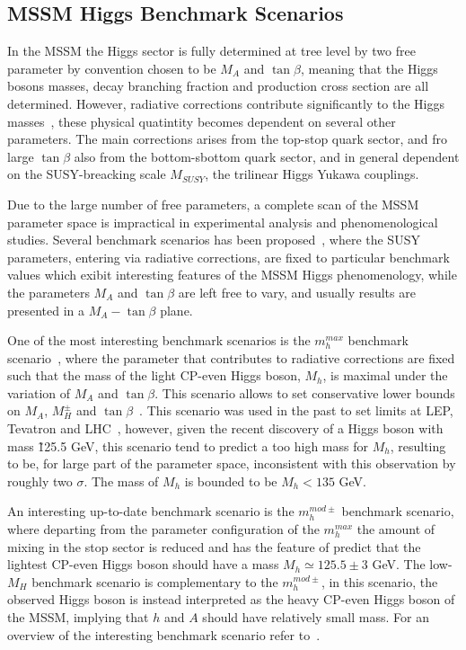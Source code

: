 \subsection{MSSM Higgs Benchmark Scenarios}
In the MSSM  the Higgs sector is fully determined at tree level by two free parameter by convention chosen to be $M_A$ and $\tan\beta$, 
meaning that the Higgs bosons masses, decay branching fraction and production cross section are all determined. However, radiative corrections
contribute significantly to the Higgs masses~\cite{sebThesis26}, these physical quatintity becomes dependent on several other parameters.
The main corrections arises from the top-stop quark sector, and fro large $\tan\beta$ also from the bottom-sbottom quark sector,
and in general dependent on the SUSY-breacking scale $M_{SUSY}$, the trilinear Higgs Yukawa couplings.

Due to the large number of free parameters, a complete scan of the MSSM parameter space is impractical in experimental analysis and phenomenological
studies. Several benchmark scenarios has been proposed~\cite{LHCxsec}, where the SUSY parameters, entering via radiative corrections, 
are fixed to particular benchmark values which exibit interesting features of the MSSM Higgs phenomenology, while the parameters 
$M_A$ and $\tan\beta$ are left free to vary, and usually results are presented in a $M_A-\tan\beta$ plane.

One of the most interesting benchmark scenarios is the $m_h^{max}$ benchmark scenario~\cite{seb26}, where the parameter that contributes to radiative
corrections are fixed such that the mass of the light CP-even Higgs boson, $M_h$, is maximal under the variation of $M_A$ and $\tan\beta$. This
scenario allows to set conservative lower bounds on $M_A$, $M_H^{\pm}$ and $\tan\beta$~\cite{Xsec243}. This scenario was used in the past 
to set limits at LEP, Tevatron and LHC~\cite{LEPLimits,TevatronLimits1,CMSLimit,ATLASLimit}, 
however, given the recent discovery of a Higgs boson with mass \~125.5 GeV, this scenario
tend to predict a too high mass for $M_h$, resulting to be, for large part of the parameter space, inconsistent with this observation
by roughly two $\sigma$. The mass of $M_h$ is bounded to be $M_h < 135$ GeV.

An interesting up-to-date benchmark scenario is the $m_h^{mod\pm}$ benchmark scenario, where departing from the parameter configuration of the $m_h^{max}$
the amount of mixing in the stop sector is reduced and has the feature of predict that the lightest CP-even Higgs boson should have a mass
$M_h \simeq 125.5 \pm 3 $ GeV. The low-$M_H$ benchmark scenario is complementary to the  $m_h^{mod\pm}$, in this scenario, the observed 
Higgs boson is instead interpreted as the heavy CP-even Higgs boson of the MSSM, implying that $h$ and $A$ should have relatively small mass.
For an overview of the interesting benchmark scenario refer to~\cite{LHCxsec}. 


